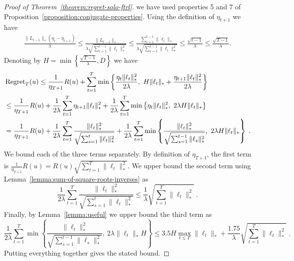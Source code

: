 \begin{proof}[Proof of Theorem~\ref{theorem:regret-solo-ftrl}]
we have used properties 5 and 7 of
Proposition~\ref{proposition:conjugate-properties}. Using the definition of
$\eta_{t+1}$ we have
\begin{align*}
\frac{\|L_{t-1}\|_* (\eta_{t} -\eta_{t+1})}{\lambda}
\le \frac{ \|L_{t-1}\|_*}{\lambda \sqrt{\sum_{i=1}^{t-1} \|\ell_i\|_*^2}}
\le \frac{ \sum_{i=1}^{t-1} \|\ell_i\|_*}{\lambda \sqrt{\sum_{i=1}^{t-1} \|\ell_i\|_*^2}}
\le \frac{\sqrt{t-1}}{\lambda}
\le \frac{\sqrt{T-1}}{\lambda}.
\end{align*}
Denoting by $H=\min\left\{\frac{\sqrt{T-1}}{\lambda},D\right\}$ we have
\begin{align*}
& \operatorname{Regret}_T(u)
\le \frac{1}{\eta_{T+1}} R(u) + \sum_{t=1}^T \min\left\{ \frac{\eta_t \|\ell_t\|_*^2}{2\lambda}, \ H \|\ell_t\|_* + \frac{\eta_{t+1} \|\ell_t\|_*^2}{2\lambda}  \right\} \\
& \le \frac{1}{\eta_{T+1}} R(u) + \frac{1}{2\lambda} \sum_{t=1}^T  \eta_{t+1} \|\ell_t\|_*^2 + \frac{1}{2\lambda} \sum_{t=1}^T \min\left\{ \eta_t \|\ell_t\|_*^2, \ 2 \lambda H \|\ell_t\|_* \right\} \\
& = \frac{1}{\eta_{T+1}} R(u) + \frac{1}{2\lambda} \sum_{t=1}^T  \frac{\|\ell_t\|_*^2}{\sqrt{\sum_{s=1}^t \|\ell_t\|_*^2}} + \frac{1}{2 \lambda} \sum_{t=1}^T \min\left\{ \frac{\|\ell_t\|_*^2}{\sqrt{\sum_{s=1}^{t-1} \|\ell_s\|_*^2}}, \ 2 \lambda H \|\ell_t\|_* \right\} \; .
\end{align*}
We bound each of the three terms separately. By definition of $\eta_{T+1}$, the
first term is $\frac{1}{\eta_{T+1}} R(u) = R(u) \sqrt{\sum_{t=1}^T
\|\ell_t\|_*^2}$.  We upper bound the second term using
Lemma~\ref{lemma:sum-of-square-roots-inverses} as
$$
\frac{1}{2\lambda} \sum_{t=1}^T  \frac{\|\ell_t\|_*^2}{\sqrt{\sum_{s=1}^t \|\ell_t\|_*^2}}
\le \frac{1}{\lambda} \sqrt{\sum_{t=1}^T \|\ell_t\|_*^2} \; .
$$
Finally, by Lemma~\ref{lemma:useful} we upper bound the third term as
$$
\frac{1}{2 \lambda} \sum_{t=1}^T \min\left\{ \frac{\|\ell_t\|_*^2}{\sqrt{\sum_{s=1}^{t-1} \|\ell_s\|_*^2}}, \ 2 \lambda \|\ell_t\|_* H \right\}
\le 3.5 H \max_{t \le T} \|\ell_t\|_* + \frac{1.75}{\lambda} \sqrt{\sum_{t=1}^T \|\ell_t\|_*^2} \; .
$$
Putting everything together gives the stated bound.
\end{proof}


